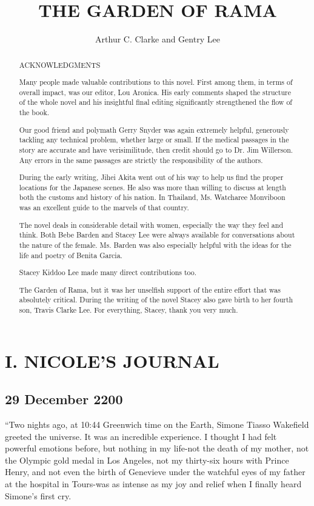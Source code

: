 \documentclass[]{article}
\title{THE GARDEN OF RAMA}
\author{Arthur C. Clarke and Gentry Lee}
\begin{document}
\maketitle

\begin{abstract}
ACKNOWLEDGMENTS

Many people made valuable contributions to this novel. First among them, in terms of overall impact, was our editor, Lou Aronica. His early comments shaped the structure of the whole novel and his insightful final editing significantly strengthened the flow of the book.

Our good friend and polymath Gerry Snyder was again extremely helpful, generously tackling any technical problem, whether large or small. If the medical passages in the story are accurate and have verisimilitude, then credit should go to Dr. Jim Willerson. Any errors in the same passages are strictly the responsibility of the authors.

During the early writing, Jihei Akita went out of his way to help us find the proper locations for the Japanese scenes. He also was more than willing to discuss at length both the customs and history of his nation. In Thailand, Ms. Watcharee Monviboon was an excellent guide to the marvels of that country.

The novel deals in considerable detail with women, especially the way they feel and think. Both Bebe Barden and Stacey Lee were always available for conversations about the nature of the female. Ms. Barden was also especially helpful with the ideas for the life and poetry of Benita Garcia.

Stacey Kiddoo Lee made many direct contributions too.

The Garden of Rama, but it was her unselfish support of the entire effort that was absolutely critical. During the writing of the novel Stacey also gave birth to her fourth son, Travis Clarke Lee. For everything, Stacey, thank you very much.


\end{abstract}


\section{I. NICOLE’S JOURNAL}
\subsection{29 December 2200}

“Two nights ago, at 10:44 Greenwich time on the Earth, Simone Tiasso Wakefield greeted the universe. It was an incredible experience. I thought I had felt powerful emotions before, but nothing in my life-not the death of my mother, not the Olympic gold medal in Los Angeles, not my thirty-six hours with Prince Henry, and not even the birth of Genevieve under the watchful eyes of my father at the hospital in Tours-was as intense as my joy and relief when I finally heard Simone’s first cry.
\end{document}
